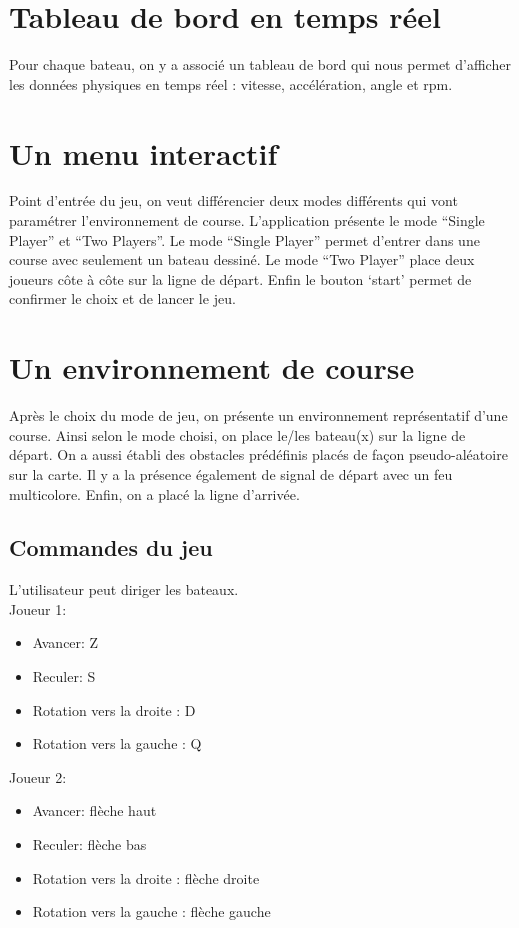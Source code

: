 \documentclass[a4paper,margin=1cm,11pt]{report}
\begin{document}
\section{Tableau de bord en temps réel}
Pour chaque bateau, on y a associé un tableau de bord qui nous permet d’afficher les données physiques en temps réel : vitesse, accélération, angle et rpm.

\section{Un menu interactif}
Point d’entrée du jeu, on veut différencier deux modes différents qui vont paramétrer l’environnement de course. L’application présente le mode “Single Player” et “Two Players”.
Le mode “Single Player” permet d’entrer dans une course avec seulement un bateau dessiné.
Le mode “Two Player” place deux joueurs côte à côte sur la ligne de départ.
Enfin le bouton ‘start’ permet de confirmer le choix et de lancer le jeu.

\section{Un environnement de course}
Après le choix du mode de jeu, on présente un environnement représentatif d’une course. Ainsi selon le mode choisi, on place le/les bateau(x) sur la ligne de départ. 
On a aussi établi des obstacles prédéfinis placés de façon pseudo-aléatoire sur la carte.
Il y a la présence également de signal de départ avec un feu multicolore. Enfin, on a placé la ligne d’arrivée.

\subsection{Commandes du jeu}
L’utilisateur peut diriger les bateaux.\\ 
Joueur 1:
\begin{itemize}
	\item Avancer: Z
	\item Reculer: S
	\item Rotation vers la droite : D
	\item Rotation vers la gauche : Q
\end{itemize}
Joueur 2:
\begin{itemize}
	\item Avancer: flèche haut
	\item Reculer: flèche bas
	\item Rotation vers la droite : flèche droite
	\item Rotation vers la gauche : flèche gauche
\end{itemize}
\end{document}

